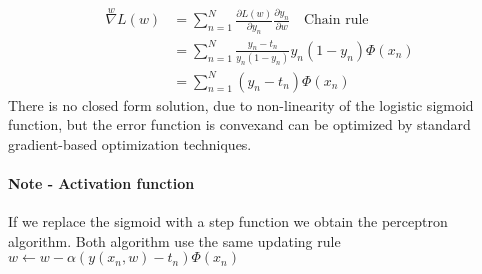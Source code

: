 \documentclass[main.tex]{subfiles}
\begin{document}
\begin{align*}
    \overset{w}{\nabla} L(w) &= \sum_{n=1}^N \frac{\partial L(w)}{\partial y_n} \frac{\partial y_n}{\partial w} \quad \text{Chain rule} \\
    &= \sum_{n=1}^N \frac{y_n - t_n}{y_n (1 - y_n)} y_n(1-y_n)\Phi(x_n) \\
    &= \sum_{n=1}^N (y_n - t_n)\Phi(x_n)
\end{align*}
There is no closed form solution, due to non-linearity of the logistic sigmoid function, but the error function is convex\footnotemark and can be optimized by standard gradient-based optimization techniques. 

\paragraph{Note - Activation function} If we replace the sigmoid with a step function we obtain the perceptron algorithm. Both algorithm use the same updating rule $w \leftarrow w - \alpha(y(x_n, w)-t_n)\Phi(x_n)$
\end{document}
